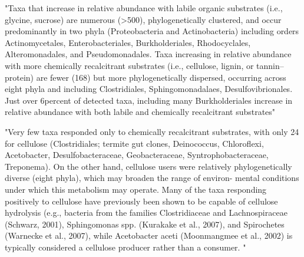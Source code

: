 "Taxa that increase in relative abundance with labile organic substrates (i.e., glycine, sucrose) are numerous (>500), phylogenetically clustered, and occur predominantly in two phyla (Proteobacteria and Actinobacteria) including orders Actinomycetales, Enterobacteriales, Burkholderiales, Rhodocyclales, Alteromonadales, and Pseudomonadales. Taxa increasing in relative abundance with more chemically recalcitrant substrates (i.e., cellulose, lignin, or tannin–protein) are fewer (168) but more phylogenetically dispersed, occurring across eight phyla and including Clostridiales, Sphingomonadalaes, Desulfovibrionales. Just over 6percent of detected taxa, including many Burkholderiales increase in relative abundance with both labile and chemically recalcitrant substrates" \cite{Goldfarb_2011}

"Very few taxa responded only to chemically recalcitrant substrates, with only 24 for cellulose (Clostridiales; termite gut clones, Deinococcus, Chloroflexi, Acetobacter, Desulfobacteraceae, Geobacteraceae, Syntrophobacteraceae, Treponema). On the other hand, cellulose users were relatively phylogenetically diverse (eight phyla), which may broaden the range of environ- mental conditions under which this metabolism may operate. Many of the taxa responding positively to cellulose have previously been shown to be capable of cellulose hydrolysis (e.g., bacteria from the families Clostridiaceae and Lachnospiraceae (Schwarz, 2001), Sphingomonas spp. (Kurakake et al., 2007), and Spirochetes (Warnecke et al., 2007), while Acetobacter aceti (Moonmangmee et al., 2002) is typically considered a cellulose producer rather than a consumer. "\cite{Goldfarb_2011}

